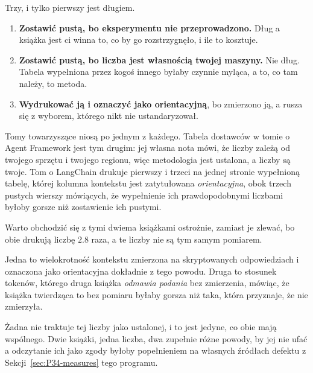 \begin{fr}
\begin{ansblock}
Trzy, i tylko pierwszy jest długiem.

\begin{enumerate}
\item \textbf{Zostawić pustą, bo eksperymentu nie przeprowadzono.} Dług
  \dash{} a książka jest ci winna to, co by go rozstrzygnęło, i ile to
  kosztuje.
\item \textbf{Zostawić pustą, bo liczba jest własnością twojej maszyny.}
  Nie dług. Tabela wypełniona przez kogoś innego byłaby czynnie myląca, a to,
  co tam należy, to metoda.
\item \textbf{Wydrukować ją i oznaczyć jako orientacyjną}, bo zmierzono ją,
  a rusza się z wyborem, którego nikt nie ustandaryzował.
\end{enumerate}
\end{ansblock}

Tomy towarzyszące niosą po jednym z każdego. Tabela dostawców w tomie o Agent
Framework jest tym drugim: jej własna nota mówi, że liczby zależą od twojego
sprzętu i twojego regionu, więc metodologia jest ustalona, a liczby są twoje.
Tom o LangChain drukuje pierwszy i trzeci na jednej stronie \dash{}
wypełnioną tabelę, której kolumna kontekstu jest zatytułowana
\emph{orientacyjna}, obok trzech pustych wierszy mówiących, że wypełnienie ich
prawdopodobnymi liczbami byłoby gorsze niż zostawienie ich pustymi.
\end{fr}

\begin{fr}
Warto obchodzić się z tymi dwiema książkami ostrożnie, zamiast je zlewać, bo
obie drukują liczbę $\num{2.8}$ raza, a te liczby nie są tym samym pomiarem.

Jedna to wielokrotność kontekstu zmierzona na skryptowanych odpowiedziach i
oznaczona jako orientacyjna dokładnie z tego powodu. Druga to stosunek
tokenów, którego druga książka \emph{odmawia podania} bez zmierzenia,
mówiąc, że książka twierdząca to bez pomiaru byłaby gorsza niż taka, która
przyznaje, że nie zmierzyła.

Żadna nie traktuje tej liczby jako ustalonej, i to jest jedyne, co obie mają
wspólnego. Dwie książki, jedna liczba, dwa zupełnie różne powody, by jej nie
ufać \dash{} a odczytanie ich jako zgody byłoby popełnieniem na własnych
źródłach defektu z Sekcji~\ref{sec:P34-measures} tego programu.
\end{fr}

